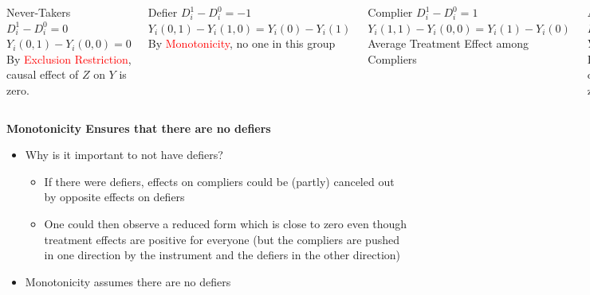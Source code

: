\documentclass[notes=show]{beamer}
\begin{document}
\begin{frame}[plain]
	\begin{columns}[t]
	\scriptsize
	\begin{block}{Never-Takers}
		$D^1_i - D^0_i = 0$ \\
		$Y_i(0,1) - Y_i(0,0) = 0$ \\
		By \textcolor{red}{Exclusion Restriction}, causal effect of $Z$ on $Y$ is zero.
	\end{block}
	\begin{block}{Defier}
		$D^1_i - D^0_i = -1$ \\
		$Y_i(0,1) - Y_i(1,0) = Y_i(0) - Y_i(1)$ \\
		By \textcolor{red}{Monotonicity}, no one in this group
	\end{block}
	\begin{block}{Complier}
		$D^1_i - D^0_i = 1$ \\
		$Y_i(1,1) - Y_i(0,0) = Y_i(1) - Y_i(0)$ \\
		Average Treatment Effect among Compliers
	\end{block}
	\begin{block}{Always-taker}
		$D^1_i - D^0_i = 0$ \\
		$Y_i(1,1) - Y_i(1,0) = 0$ \\
		By \textcolor{red}{Exclusion Restriction}, causal effect of $Z$ on $Y$ is zero.
	\end{block}
	\end{columns}
\end{frame}


\begin{frame}[plain]

	\begin{center}
	\textbf{Monotonicity Ensures that there are no defiers}
	\end{center}
	
	\begin{itemize}
	\item Why is it important to not have defiers?
		\begin{itemize}
		\item If there were defiers, effects on compliers could be (partly) canceled out by opposite effects on defiers
		\item One could then observe a reduced form which is close to zero even though treatment effects are positive for everyone (but the compliers are pushed in one direction by the instrument and the defiers in the other direction)
		\end{itemize}
	\item Monotonicity assumes there are no defiers
	\end{itemize}

\end{frame}
\end{document}
